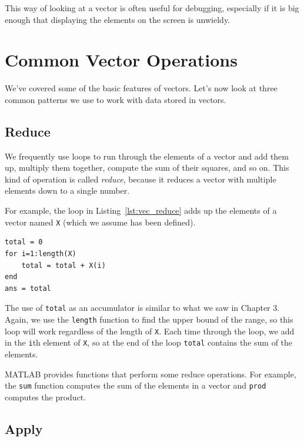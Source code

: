 This way of looking at a vector is often useful for debugging, especially
if it is big enough that displaying the elements on
the screen is unwieldy.


\section{Common Vector Operations}

We've covered some of the basic features of vectors. Let's now look at three common patterns we use to work with data stored in vectors.

\subsection{Reduce}
\label{reduce}

We frequently use loops to run through the elements of a vector
and add them up, multiply them together, compute the sum
of their squares, and so on.  This kind of operation is called \emph{reduce},
because it reduces a vector with multiple elements down to a single
number.


For example, the loop in Listing~\ref{lst:vec_reduce} adds up the elements of a vector named {\tt X} (which we assume has been defined).

\begin{lstlisting}[caption={Reducing a vector to a single scalar value (the sum)}, label={lst:vec_reduce}]
total = 0
for i=1:length(X)
    total = total + X(i)
end
ans = total
\end{lstlisting}

The use of {\tt total} as an accumulator is similar to what we
saw in Chapter 3.  Again, we use the {\tt length} function
to find the upper bound of the range, so this loop will work
regardless of the length of {\tt X}.
Each time through the loop, we add
in the {\tt i}th element of {\tt X}, so at the end of the loop
{\tt total} contains the sum of the elements.


MATLAB provides functions that perform some reduce operations.
For example, the {\tt sum} function computes the sum of the elements
in a vector and {\tt prod} computes the product.


\subsection{Apply}
\label{apply}

